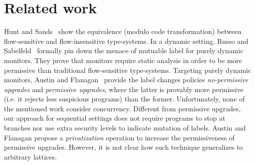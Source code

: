 \section{Related work}

Hunt and Sands~\citep{Hunt:2006} show the equivalence (modulo code
transformation) between flow-sensitive and flow-insensitive type-systems. In a
dynamic setting, Russo and Sabelfeld~\citep{Russo:2010} formally pin down the
menace of mutuable label for purely dynamic monitors. They prove that monitors
require static analysis in order to be more permissive than traditional
flow-sensitive type-systems. Targeting purely dynamic monitors, Austin and
Flanagan~\citep{Austin:Flanagan:PLAS10} provide the label changes policies
\emph{no-permissive upgrades} and \emph{permissive upgrades}, where the latter
is provably more permissive (i.e. it rejects less suspicious programs) than the
former. Unfortunately, none of the mentioned work consider
concurrency. Different from permissive upgrades, our approach for sequential
settings does not require programs to stop at branches nor use extra security
levels to indicate mutation of labels. Austin and Flanagan propose a
\emph{privatization} operation to increase the permissiveness of permissive
upgrades. However, it is not clear how such technique generalizes to arbitrary
lattices.


